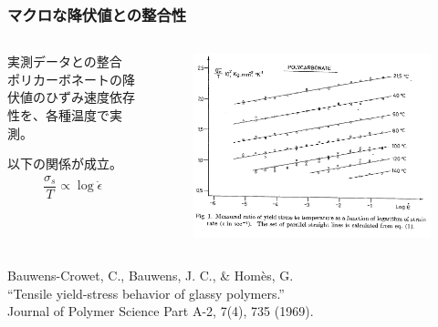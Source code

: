 \documentclass[10pt, dvipdfmx]{beamer}
\begin{document}
\begin{frame}
\frametitle{マクロな降伏値との整合性}


\begin{columns}[totalwidth=1\textwidth]

\begin{block}{実測データとの整合}
ポリカーボネートの降伏値のひずみ速度依存性を、各種温度で実測。

以下の関係が成立。
\begin{align*}
\dfrac{\sigma_s}{T} 
	\propto \log \dot{\epsilon}
\end{align*}
\end{block}

	\begin{figure}
	\centering
	\includegraphics[width=\textwidth]{fig2.png}
	\end{figure}
%

\end{columns}
Bauwens-Crowet, C., Bauwens, J. C., \& Homès, G. \\
``Tensile yield-stress behavior of glassy polymers.''\\
Journal of Polymer Science Part A-2, 7(4), 735 (1969). 
\end{frame}
\end{document}
